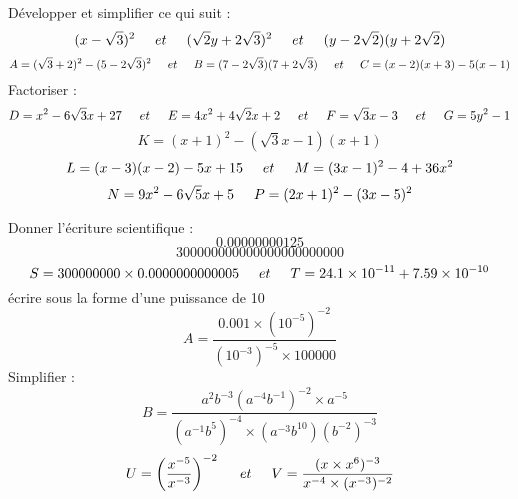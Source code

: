 \documentclass[a4paper,addpoints,12pt]{exam}
\begin{document}
\devoir[prv=false,ds=false,num=1 ,niv=3 ,date=19/10/2022,Rdate=31/10/2022]

\begin{exo}
\begin{questions}
\question Développer et simplifier ce qui suit : 
\[ (x-\sqrt{3})^{2}\hspace*{0.5cm}et\hspace*{0.5cm}
	(\sqrt{2}y+2\sqrt{3})^{2}\hspace*{0.5cm}et\hspace*{0.5cm}
		(y-2\sqrt{2})(y+2\sqrt{2})\]
\[
A=(\sqrt{3}+2)^{2}-(5-2\sqrt{3})^{2}\hspace*{0.5 cm}et\hspace*{0.5 cm}
B=(7-2\sqrt{3})(7+2\sqrt{3})\hspace*{0.5 cm}et\hspace*{0.5 cm}
C=(x-2)(x+3)-5(x-1)
\]		
\question Factoriser :
\[ D=x^{2}-6\sqrt{3}x+27\hspace*{0.5cm}et\hspace*{0.5cm}
	E=4x^{2}+4\sqrt{2}x+2\hspace*{0.5cm}et\hspace*{0.5cm}
		F=\sqrt{3}x-3\hspace*{0.5cm}et\hspace*{0.5cm}
		G=5y^{2}-1\]
	\[K=(x+1)^{2}-(\sqrt{3}x-1)(x+1)\]
	\[
L=(x-3)(x-2)-5x+15\hspace*{0.5 cm}et\hspace*{0.5 cm}
M=(3x-1)^{2}-4+36x^{2}\]
\[N=9x^{2}-6\sqrt{5}x+5\hspace*{0.5 cm}
P=(2x+1)^{2}-(3x-5)^{2}
\]
\end{questions}
\end{exo}

\begin{exo}
\begin{questions}

\question Donner l'écriture scientifique :
\[0.00000000125 \]
\[300000000000000000000000 \]
\[
S=300000000 \times 0.0000000000005 \hspace*{0.5cm}et\hspace*{0.5cm}
T=24.1 \times 10^{-11}+ 7.59 \times 10^{-10}
\]
\question écrire sous la forme d'une puissance de 10
\[ A=\dfrac{0.001 \times (10^{-5})^{-2}}{(10^{-3})^{-5}\times 100000}\]
\question Simplifier :
\[ B=\dfrac{a^{2}b^{-3}(a^{-4}b^{-1})^{-2}\times a^{-5}}{(a^{-1}b^{5})^{-4}\times (a^{-3}b^{10})(b^{-2})^{-3}} \]
\[
U=\left( \dfrac{x^{-5}}{x^{-3}}\right)^{-2} \hspace*{0.5cm}et\hspace*{0.5cm}
V=\dfrac{(x \times x^{6})^{-3}}{x^{-4}\times (x^{-3})^{-2}}
\]
\end{questions}
\end{exo}
\end{document}
